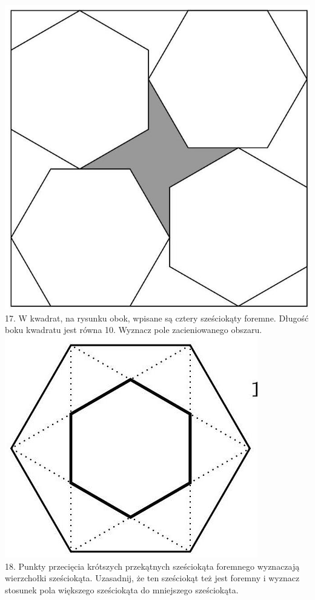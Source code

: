 \documentclass[10pt]{article}
\begin{document}
\includegraphics[max width=\textwidth, center]{2024_11_21_e9b4faa005d5be2cc318g-058(1)}\\
17. W kwadrat, na rysunku obok, wpisane są cztery sześciokąty foremne. Długość boku kwadratu jest równa 10. Wyznacz pole zacieniowanego obszaru.\\
\includegraphics[max width=\textwidth, center]{2024_11_21_e9b4faa005d5be2cc318g-058}\\
18. Punkty przecięcia krótszych przekątnych sześciokąta foremnego wyznaczają wierzchołki sześciokąta. Uzasadnij, że ten sześciokąt też jest foremny i wyznacz stosunek pola większego sześciokąta do mniejszego sześciokąta.
\end{document}
